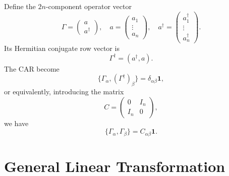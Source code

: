 \documentclass[aps,pre,twocolumn,floatfix,superscriptaddress,10pt]{revtex4}
\begin{document}
Define the $2n$-component operator vector 
\begin{equation}
\Gamma = 
\begin{pmatrix}
a \\ 
a^\dagger%
\end{pmatrix}%
, \quad a = 
\begin{pmatrix}
a_1 \\ 
\vdots \\ 
a_n%
\end{pmatrix}%
, \quad a^\dagger = 
\begin{pmatrix}
a_1^\dagger \\ 
\vdots \\ 
a_n^\dagger%
\end{pmatrix}%
.
\end{equation}
Its Hermitian conjugate row vector is 
\begin{equation}
\Gamma^\dagger = (a^\dagger, a).
\end{equation}
The CAR become 
\begin{equation}
\{ \Gamma_\alpha, (\Gamma^\dagger)_\beta \} = \delta_{\alpha\beta} \mathbf{1}%
,
\end{equation}
or equivalently, introducing the matrix 
\begin{equation}
C = 
\begin{pmatrix}
0 & I_n \\ 
I_n & 0%
\end{pmatrix}%
,
\end{equation}
we have 
\begin{equation}
\{ \Gamma_\alpha, \Gamma_\beta \} = C_{\alpha\beta} \mathbf{1}.
\end{equation}

\section{General Linear Transformation}
\end{document}

